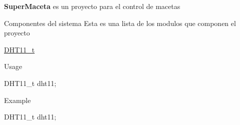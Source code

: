 {\bfseries{Super\+Maceta}} es un proyecto para el control de macetas

\begin{DoxyParagraph}{Componentes del sistema}
Esta es una lista de los modulos que componen el proyecto
\begin{DoxyItemize}
\item \mbox{\hyperlink{group___d_h_t11_ga3e97a241d353f95774a23c235c6dc368}{DHT11\+\_\+t}} 
\end{DoxyItemize}
\end{DoxyParagraph}
\begin{DoxyParagraph}{Usage}

\end{DoxyParagraph}
\begin{DoxyVerb}DHT11_t dht11;
\end{DoxyVerb}


\begin{DoxyParagraph}{Example}

\end{DoxyParagraph}
\begin{DoxyVerb}DHT11_t dht11;
\end{DoxyVerb}


 